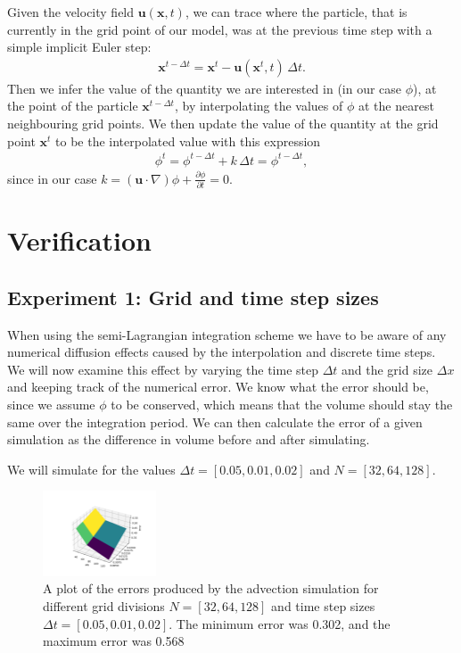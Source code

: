 \documentclass[acmtog]{acmart}
\begin{document}
Given the velocity field $\boldsymbol u(\boldsymbol x, t)$, we can trace where
the particle, that is currently in the grid point of our model, was at the
previous time step with a simple implicit Euler step:
%
\begin{align}
  \boldsymbol x^{t-\Delta t} = \boldsymbol x^t - \boldsymbol u(\boldsymbol x^t, t) \, \Delta t.
\end{align}
%
Then we infer the value of the quantity we are interested in (in our case
$\phi$), at the point of the particle $\boldsymbol x^{t -\Delta t}$, by
interpolating the values of $\phi$ at the nearest neighbouring grid points. We
then update the value of the quantity at the grid point $\boldsymbol x^{t}$ to
be the interpolated value with this expression
%
\begin{align}
  \phi^{t} = \phi^{t-\Delta t} + k \, \Delta t = \phi^{t-\Delta t},
\end{align}
%
since in our case $k = (\boldsymbol u \cdot \nabla) \phi + \frac{\partial
    \phi}{\partial t} = 0$.

\section{Verification}
\subsection{Experiment 1: Grid and time step sizes}

When using the semi-Lagrangian integration scheme we have to be aware of any
numerical diffusion effects caused by the interpolation and discrete time
steps. We will now examine this effect by varying the time step $\Delta t$ and
the grid size $\Delta x$ and keeping track of the numerical error. We know what
the error should be, since we assume $\phi$ to be conserved, which means that
the volume should stay the same over the integration period. We can then
calculate the error of a given simulation as the difference in volume before
and after simulating.

We will simulate for the values $\Delta t = [0.05, 0.01, 0.02]$ and $N = [32,
  64, 128]$.

\begin{figure}[H]
  \centering
  \includegraphics[width=0.3\textwidth]{Images/advection/exp1_errors.png}
  \caption{A plot of the errors produced by the advection simulation for different grid divisions $N = [32, 64, 128]$ and time step sizes $\Delta t = [0.05, 0.01, 0.02]$. The minimum error was 0.302, and the maximum error was 0.568}
  \label{fig:adv_exp1_errors}
\end{figure}
\end{document}
